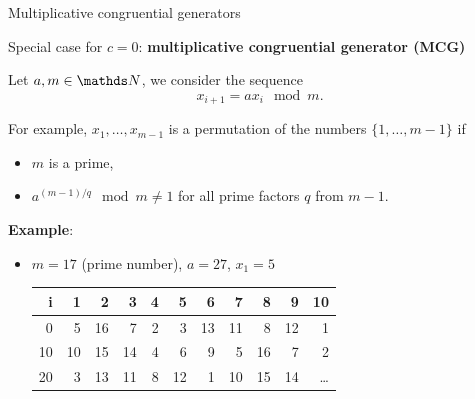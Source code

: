 \begin{vbframe}{Multiplicative congruential generators}

Special case for $c = 0$: \textbf{multiplicative congruential generator (MCG)}

\lz

Let $a, m \in\N$,  we consider the sequence
$$
  x_{i+1} = a x_i \mod m.
$$

\medskip

For example, $x_1, \ldots, x_{m-1}$ is a permutation of the numbers $\{1, \ldots, m-1\}$ if
\begin{itemize}
\item $m$ is a prime,
\item $a^{(m - 1) / q} \mod m \not= 1$ for all prime factors $q$ from $m-1$.
\end{itemize}

\framebreak


\textbf{Example}:

\begin{itemize}
\item $m=17$ (prime number), $a=27$, $x_1 = 5$
%
%
%
%


\begin{table}
\begin{footnotesize}
\centering
\begin{tabular}{r|rrrrrrrrrr}
  \hline
i & 1 & 2 & 3 & 4 & 5 & 6 & 7 & 8 & 9 & 10 \\
  \hline
0  & \cellcolor{orange}5 & 16 & 7 & 2 & 3 & 13 & 11 & 8 & 12 & 1 \\
10 & 10 & 15 & 14 & 4 & 6 & 9 & \cellcolor{orange}5 & 16 & 7 & 2 \\
20 & 3 & 13 & 11 & 8 & 12 & 1 & 10 & 15 & 14 &  \ldots \\
\hline
\end{tabular}
\end{footnotesize}
\end{table}


\end{itemize}
\end{vbframe}

